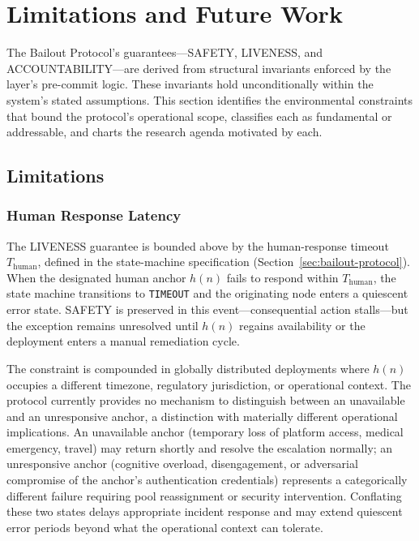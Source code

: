 \section{Limitations and Future Work}\label{sec:limitations}

The Bailout Protocol's guarantees---SAFETY, LIVENESS, and ACCOUNTABILITY---are derived from structural invariants enforced by the \fact{} layer's pre-commit logic. These invariants hold unconditionally within the system's stated assumptions. This section identifies the environmental constraints that bound the protocol's operational scope, classifies each as fundamental or addressable, and charts the research agenda motivated by each.

\subsection{Limitations}\label{sec:limitations:items}

\subsubsection{Human Response Latency}
\label{sec:lim:latency}

The LIVENESS guarantee is bounded above by the human-response timeout $T_{\text{human}}$, defined in the state-machine specification (Section~\ref{sec:bailout-protocol}). When the designated human anchor $h(n)$ fails to respond within $T_{\text{human}}$, the state machine transitions to \texttt{TIMEOUT} and the originating node enters a quiescent error state. SAFETY is preserved in this event---consequential action stalls---but the exception remains unresolved until $h(n)$ regains availability or the deployment enters a manual remediation cycle.

The constraint is compounded in globally distributed deployments where $h(n)$ occupies a different timezone, regulatory jurisdiction, or operational context. The protocol currently provides no mechanism to distinguish between an unavailable and an unresponsive anchor, a distinction with materially different operational implications. An unavailable anchor (temporary loss of platform access, medical emergency, travel) may return shortly and resolve the escalation normally; an unresponsive anchor (cognitive overload, disengagement, or adversarial compromise of the anchor's authentication credentials) represents a categorically different failure requiring pool reassignment or security intervention. Conflating these two states delays appropriate incident response and may extend quiescent error periods beyond what the operational context can tolerate.

